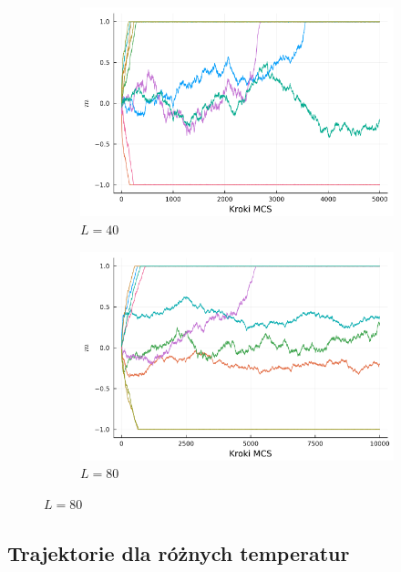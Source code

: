 \documentclass[12pt]{article}
\begin{document}
\begin{figure}[H]
  \centering

  \begin{subfigure}[b]{0.45\linewidth}
    \centering
	\centerline{\includegraphics[scale=0.45]{../data/magnetizations/40.png}}
	\caption{$L=40$}
    \label{fig:image1}
  \end{subfigure}
  \hfill
  \begin{subfigure}[b]{0.45\linewidth}
    \centering
	\includegraphics[scale=0.45]{../data/magnetizations/80.png}
	\caption{$L=80$}
    \label{fig:image2}
  \end{subfigure}

  \label{fig:series}
\end{figure}


\subsection{Trajektorie dla różnych temperatur}
\end{document}
